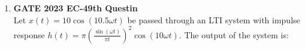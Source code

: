 \documentclass{article}
\begin{document}
\begin{enumerate}
    
    \item \textbf{GATE 2023 EC-49th Questin}\\
          Let \(x(t) = 10 \cos(10.5 \omega t)\) be passed through an LTI system with impulse response \(h(t) = \pi\left(\frac{\sin(\omega t)}{\pi t}\right)^2 \cos(10 \omega t)\). The output of the system is:
  \end{enumerate}
  
\end{document}

